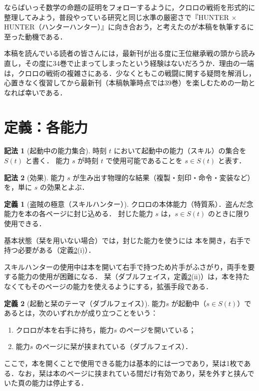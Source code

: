 \documentclass[a4paper,12pt]{jarticle}
\theoremstyle{definition}
\newtheorem{definition}{定義}
\newtheorem{notation}{記法}
\theoremstyle{plain}
\theoremstyle{definition}
\theoremstyle{remark}
\newcommand{\Act}{S}   %
\begin{document}
ならばいっそ数学の命題の証明をフォローするように，クロロの戦術を形式的に整理してみよう，普段やっている研究と同じ水準の厳密さで『HUNTER $\times$ HUNTER（ハンターハンター）』に向き合おう，と考えたのが本稿を執筆するに至った動機である．

本稿を読んでいる読者の皆さんには，最新刊が出る度に王位継承戦の頭から読み直し，その度に34巻で止まってしまったという経験はないだろうか．理由の一端は，クロロの戦術の複雑さにある．少なくともこの戦闘に関する疑問を解消し，心置きなく復習してから最新刊（本稿執筆時点では39巻）を楽しむための一助となれば幸いである．

\section{定義：各能力}

\begin{notation}[起動中の能力集合]
時刻 $t$ において起動中の能力（スキル）の集合を $\Act(t)$ と書く．
能力 $s$ が時刻 $t$ で使用可能であることを $s\in\Act(t)$ と表す．
\end{notation}

\begin{notation}[効果]
能力 $s$ が生み出す物理的な結果（複製・刻印・命令・変装など）を，単に $s$ の効果とよぶ．
\end{notation}

\begin{definition}[盗賊の極意（スキルハンター）]
クロロの本体能力（特質系）．盗んだ念能力を本の各ページに封じ込める．
封じた能力 $s$ は，$s\in\Act(t)$ のときに限り使用できる．

基本状態（栞を用いない場合）では，封じた能力を使うには
本を開き，右手で持つ必要がある（定義\ref{def:active}(i)）．
\end{definition}

スキルハンターの使用中は本を開いて右手で持つため片手がふさがり，両手を要する能力の使用が困難になる．
栞（ダブルフェイス，定義\ref{def:active}(ii)）は，本を持たなくてもそのページの能力を使えるようにする，拡張手段である．

\begin{definition}[起動と栞のテーマ（ダブルフェイス）]\label{def:active}
能力$s$ が起動中（$s\in\Act(t)$）であるとは，次のいずれかが成り立つことをいう：
\begin{enumerate}
\item[(i)] クロロが本を右手に持ち，能力$s$ のページを開いている；
\item[(ii)] 能力$s$ のページに栞が挟まれている（ダブルフェイス）．
\end{enumerate}
ここで，本を開くことで使用できる能力は基本的には一つであり，栞は1枚である．なお，栞は本のページに挟まれている間だけ有効であり，栞を外すと挟んでいた頁の能力は停止する．
\end{definition}
\end{document}
